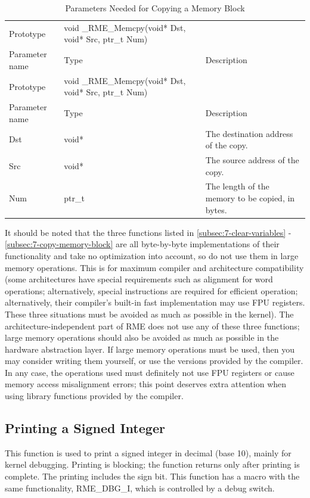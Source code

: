 \begin{xltabular}{\textwidth}{@{}>{\hsize\raggedright\arraybackslash}X>{\hsize\raggedright\arraybackslash}X>{\hsize\raggedright\arraybackslash}X@{}}
\caption{Parameters Needed for Copying a Memory Block}\label{tab:7-87-copy-memory-block-parameters}\\
\toprule
Prototype & void \_RME\_Memcpy(void* Dst, void* Src, ptr\_t Num)
&\tabularnewline
Parameter name & Type & Description\tabularnewline
\endfirsthead
\toprule
Prototype & void \_RME\_Memcpy(void* Dst, void* Src, ptr\_t Num)
&\tabularnewline
Parameter name & Type & Description\tabularnewline
\midrule
\endhead
\bottomrule
\endlastfoot
Dst & void* & The destination address of the copy.\tabularnewline
Src & void* & The source address of the copy.\tabularnewline
Num & ptr\_t & The length of the memory to be copied, in bytes.\tabularnewline
\end{xltabular}
\nopagebreak[4]

It should be noted that the three functions listed in \ref{subsec:7-clear-variables}
-\ref{subsec:7-copy-memory-block}
are all byte-by-byte implementations of their functionality and take no optimization into account, so do not use them in large memory operations. This is for maximum compiler and architecture compatibility (some architectures have special requirements such as alignment for word operations; alternatively, special instructions are required for efficient operation; alternatively, their compiler's built-in fast implementation may use FPU registers. These three situations must be avoided as much as possible in the kernel). The architecture-independent part of RME does not use any of these three functions; large memory operations should also be avoided as much as possible in the hardware abstraction layer. If large memory operations must be used, then you may consider writing them yourself, or use the versions provided by the compiler. In any case, the operations used must definitely not use FPU registers or cause memory access misalignment errors; this point deserves extra attention when using library functions provided by the compiler.

\subsection{Printing a Signed Integer}\label{subsec:7-print-signed-integer}

This function is used to print a signed integer in decimal (base 10), mainly for kernel debugging. Printing is blocking; the function returns only after printing is complete. The printing includes the sign bit. This function has a macro with the same functionality, RME\_DBG\_I, which is controlled by a debug switch.

